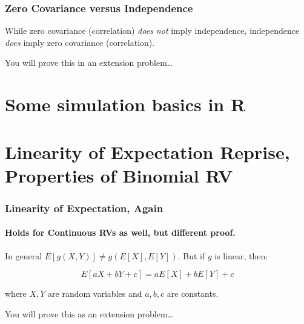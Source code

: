 \begin{frame}
  \frametitle{Zero Covariance versus Independence}
  While zero covariance (correlation) \emph{does not} imply independence, \alert{independence \emph{does} imply zero covariance (correlation)}.


  \vspace{2em}

  \hfill \alert{You will prove this in an extension problem\ldots}

\end{frame}
\section{Some simulation basics in R}
\section{Linearity of Expectation Reprise, Properties of Binomial RV}

\begin{frame}
\frametitle{Linearity of Expectation, Again}
\framesubtitle{Holds for Continuous RVs as well, but different proof.}
In general $E[g(X,Y)]\neq g(E[X],E[Y])$. 
But if $g$ is linear, then:

\Large
$$\boxed{E[aX + bY + c] = aE[X] + bE[Y] + c}$$

\normalsize
where $X,Y$ are random variables and $a,b,c$ are constants.

\vspace{2em}

\alert{You will prove this as an extension problem\ldots}

\end{frame}

